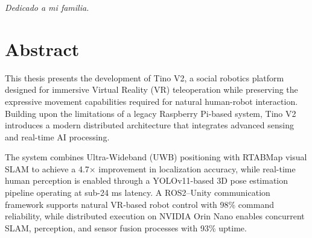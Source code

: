 \documentclass{Configuration_Files/PoliMi3i_thesis}
\begin{document}


\pagestyle{empty} %
\frontmatter %



\pagebreak
\pagestyle{empty}
\hspace{0pt}
\vfill
\textit{Dedicado a mi familia.}
\vfill
\hspace{0pt}
\pagebreak

\startpreamble
\setcounter{page}{1} %

\chapter*{Abstract} 
This thesis presents the development of Tino V2, a social robotics platform designed for immersive Virtual Reality (VR) teleoperation while preserving the expressive movement capabilities required for natural human-robot interaction. Building upon the limitations of a legacy Raspberry Pi-based system, Tino V2 introduces a modern distributed architecture that integrates advanced sensing and real-time AI processing.

The system combines Ultra-Wideband (UWB) positioning with RTABMap visual SLAM to achieve a 4.7× improvement in localization accuracy, while real-time human perception is enabled through a YOLOv11-based 3D pose estimation pipeline operating at sub-24 ms latency. A ROS2–Unity communication framework supports natural VR-based robot control with 98\% command reliability, while distributed execution on NVIDIA Orin Nano enables concurrent SLAM, perception, and sensor fusion processes with 93\% uptime.
\end{document}
